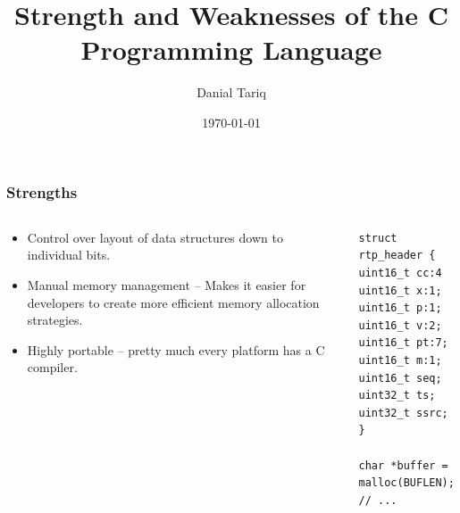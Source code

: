 \documentclass{beamer}
\title{Strength and Weaknesses of the C Programming Language}
\author{Danial Tariq}
\institute{Advanced Systems Programming}
\date{\today}
\begin{document}
\frame{\titlepage}

\begin{frame}[fragile]
    \frametitle{Strengths}

    \begin{columns}
        \begin{column}{0.5\textwidth}
            \begin{itemize}
                \item Control over layout of data structures down to individual bits.
                \item Manual memory management -- Makes it easier for developers to create more efficient memory allocation strategies.
                \item Highly portable -- pretty much every platform has a C compiler.
            \end{itemize}
        \end{column}
        \begin{column}{0.5\textwidth}
            \begin{verbatim}
struct rtp_header {
uint16_t cc:4
uint16_t x:1;
uint16_t p:1;
uint16_t v:2;
uint16_t pt:7;
uint16_t m:1;
uint16_t seq;
uint32_t ts;
uint32_t ssrc;
}

char *buffer = malloc(BUFLEN);
// ...
                      \end{verbatim}
        \end{column}
    \end{columns}
\end{frame}
\end{document}
